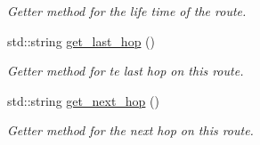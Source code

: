 \begin{DoxyCompactItemize}
\begin{DoxyCompactList}\small\item\em Getter method for the life time of the route. \end{DoxyCompactList}\item 
std\+::string \hyperlink{class_aodv__rrep_acbce91f19fcf4379a0c67a12025ea345}{get\+\_\+last\+\_\+hop} ()\hypertarget{class_aodv__rrep_acbce91f19fcf4379a0c67a12025ea345}{}\label{class_aodv__rrep_acbce91f19fcf4379a0c67a12025ea345}

\begin{DoxyCompactList}\small\item\em Getter method for te last hop on this route. \end{DoxyCompactList}\item 
std\+::string \hyperlink{class_aodv__rrep_abe9f7f6a0836aa2979231adbefecf5a4}{get\+\_\+next\+\_\+hop} ()\hypertarget{class_aodv__rrep_abe9f7f6a0836aa2979231adbefecf5a4}{}\label{class_aodv__rrep_abe9f7f6a0836aa2979231adbefecf5a4}

\begin{DoxyCompactList}\small\item\em Getter method for the next hop on this route. \end{DoxyCompactList}\end{DoxyCompactItemize}
